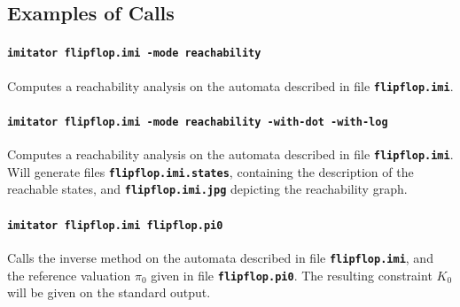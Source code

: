 \documentclass[a4paper,11pt]{report}
\newcommand{\imitator}{\textsf{IMITATOR}}
\newcommand{\imitatorExec}{\code{imitator}}
\newcommand{\code}[1]{\textbf{\texttt{#1}}}
\begin{document}
\subsection{Examples of Calls}

\paragraph{\code{\imitatorExec{} flipflop.imi -mode reachability}}
Computes a reachability analysis on the automata described in file \code{flipflop.imi}.

\paragraph{\code{\imitatorExec{} flipflop.imi -mode reachability -with-dot -with-log}}
Computes a reachability analysis on the automata described in file \code{flipflop.imi}.
Will generate files \code{flipflop.imi.states}, containing the description of the reachable states, and \code{flipflop.imi.jpg} depicting the reachability graph.


\paragraph{\code{\imitatorExec{} flipflop.imi flipflop.pi0}}
Calls the inverse method on the automata described in file \code{flipflop.imi}, and the reference valuation $\pi_0$ given in file \code{flipflop.pi0}.
The resulting constraint $K_0$ will be given on the standard output.


\end{document}
